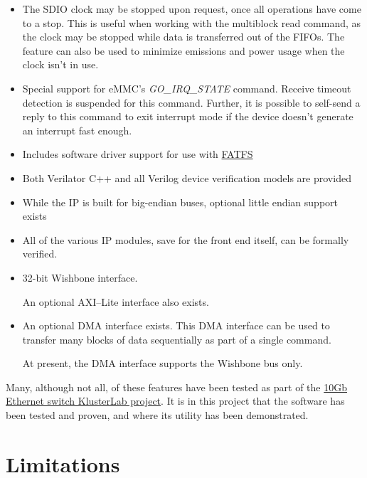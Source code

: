 \documentclass{gqtekspec}
\newcommand{\zhref}[2]{\href{#1}{\textcolor{dkblue}{#2}}}
\begin{document}
\begin{itemize}
\item The SDIO clock may be stopped upon request, once all operations have
	come to a stop.  This is useful when working with the multiblock read
	command, as the clock may be stopped while data is transferred out
	of the FIFOs.  The feature can also be used to minimize emissions
	and power usage when the clock isn't in use.

\item Special support for eMMC's {\em GO\_IRQ\_STATE} command.  Receive timeout
	detection is suspended for this command.  Further, it is possible to
	self-send a reply to this command to exit interrupt mode if the device
	doesn't generate an interrupt fast enough.

\item Includes software driver support for use with 
	\zhref{http://elm-chan.org/fsw/ff/}{FATFS}

\item Both Verilator C++ and all Verilog device verification models are
	provided

\item While the IP is built for big-endian buses, optional little endian
	support exists

\item All of the various IP modules, save for the front end itself, can be
	formally verified.

\item 32-bit Wishbone interface.

	An optional AXI--Lite interface also exists.

\item An optional DMA interface exists.  This DMA interface can be used to
	transfer many blocks of data sequentially as part of a single command.

	At present, the DMA interface supports the Wishbone bus only.

\end{itemize}

Many, although not all, of these features have been tested as part of the
\zhref{https://github.com/ZipCPU/eth10g}{10Gb Ethernet switch KlusterLab
project}.  It is in this project that the software has been tested and proven,
and where its utility has been demonstrated.

\section{Limitations}
\end{document}
